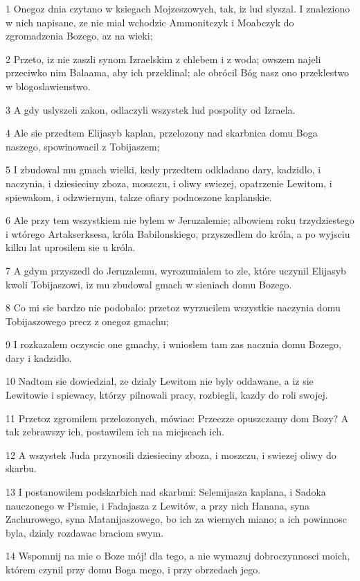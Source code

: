 \par 1 Onegoz dnia czytano w ksiegach Mojzeszowych, tak, iz lud slyszal. I znaleziono w nich napisane, ze nie mial wchodzic Ammonitczyk i Moabczyk do zgromadzenia Bozego, az na wieki;
\par 2 Przeto, iz nie zaszli synom Izraelskim z chlebem i z woda; owszem najeli przeciwko nim Balaama, aby ich przeklinal; ale obrócil Bóg nasz ono przeklestwo w blogoslawienstwo.
\par 3 A gdy uslyszeli zakon, odlaczyli wszystek lud pospolity od Izraela.
\par 4 Ale sie przedtem Elijasyb kaplan, przelozony nad skarbnica domu Boga naszego, spowinowacil z Tobijaszem;
\par 5 I zbudowal mu gmach wielki, kedy przedtem odkladano dary, kadzidlo, i naczynia, i dziesieciny zboza, moszczu, i oliwy swiezej, opatrzenie Lewitom, i spiewakom, i odzwiernym, takze ofiary podnoszone kaplanskie.
\par 6 Ale przy tem wszystkiem nie bylem w Jeruzalemie; albowiem roku trzydziestego i wtórego Artakserksesa, króla Babilonskiego, przyszedlem do króla, a po wyjsciu kilku lat uprosilem sie u króla.
\par 7 A gdym przyszedl do Jeruzalemu, wyrozumialem to zle, które uczynil Elijasyb kwoli Tobijaszowi, iz mu zbudowal gmach w sieniach domu Bozego.
\par 8 Co mi sie bardzo nie podobalo: przetoz wyrzucilem wszystkie naczynia domu Tobijaszowego precz z onegoz gmachu;
\par 9 I rozkazalem oczyscic one gmachy, i wnioslem tam zas nacznia domu Bozego, dary i kadzidlo.
\par 10 Nadtom sie dowiedzial, ze dzialy Lewitom nie byly oddawane, a iz sie Lewitowie i spiewacy, którzy pilnowali pracy, rozbiegli, kazdy do roli swojej.
\par 11 Przetoz zgromilem przelozonych, mówiac: Przeczze opuszczamy dom Bozy? A tak zebrawszy ich, postawilem ich na miejscach ich.
\par 12 A wszystek Juda przynosili dziesieciny zboza, i moszczu, i swiezej oliwy do skarbu.
\par 13 I postanowilem podskarbich nad skarbmi: Selemijasza kaplana, i Sadoka nauczonego w Pismie, i Fadajasza z Lewitów, a przy nich Hanana, syna Zachurowego, syna Matanijaszowego, bo ich za wiernych miano; a ich powinnosc byla, dzialy rozdawac braciom swym.
\par 14 Wspomnij na mie o Boze mój! dla tego, a nie wymazuj dobroczynnosci moich, którem czynil przy domu Boga mego, i przy obrzedach jego.
